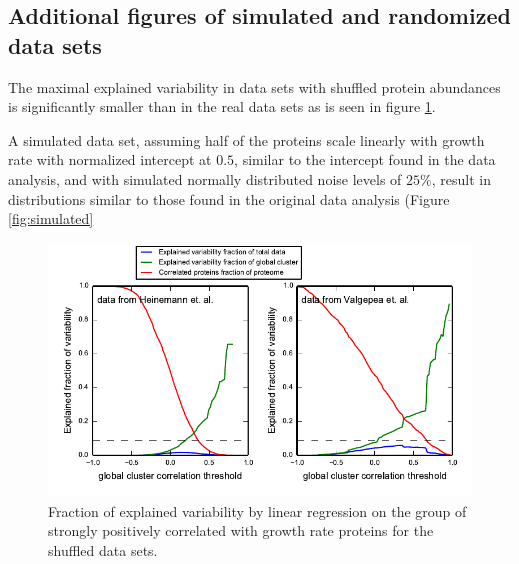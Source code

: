\documentclass[a4paper]{article}
\begin{document}
\subsection{Additional figures of simulated and randomized data sets}
The maximal explained variability in data sets with shuffled protein abundances is significantly smaller than in the real data sets as is seen in figure \ref{fig:shuffledexpvar}.

A simulated data set, assuming half of the proteins scale linearly with growth rate with normalized intercept at $0.5$, similar to the intercept found in the data analysis, and with simulated normally distributed noise levels of $25\%$, result in distributions similar to those found in the original data analysis (Figure \ref{fig:simulated}

\begin{figure}[H]
\begin{center}
\includegraphics[width=1\columnwidth]{shuffleExpVar3.pdf}
\caption{\label{fig:shuffledexpvar}
Fraction of explained variability by linear regression on the group of strongly positively correlated with growth rate proteins for the shuffled data sets.
}
\end{center}
\end{figure}
\end{document}
